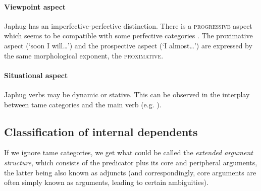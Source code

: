 \documentclass[a4paper, oneside, 12pt]{report}
\newcommand*{\citetable}[1]{Table~{#1}}
\newcommand*{\citepage}[1]{p.~{#1}}
\newcommand*{\term}[1]{\emph{#1}}
\newcommand{\category}[1]{\textsc{#1}}
\newcommand{\translate}[1]{`#1'}
\begin{document}
\paragraph*{Viewpoint aspect}
Japhug has an imperfective-perfective distinction.
There is a \category{progressive} aspect 
which seems to be compatible with some perfective categories
\citep[\citetable{21.8}]{jacques2021grammar}. 
The proximative aspect (\translate{soon I will\dots})
and the prospective aspect (\translate{I almost\dots})
are expressed by the same morphological exponent, the \category{proximative}.
    
\paragraph*{Situational aspect}
Japhug verbs may be dynamic or stative. 
This can be observed in the interplay between \ac{tame} categories
and the main verb (e.g. \citealt[\citepage{1102}]{jacques2021grammar}).

\subsection{Classification of internal dependents}\label{sec:grammatical.clause.internal}

If we ignore \ac{tame} categories,
we get what could be called the \term{extended argument structure},
which consists of the predicator plus its core and peripheral arguments,
the latter being also known as adjuncts
(and correspondingly, core arguments are often simply known as arguments,
leading to certain ambiguities). 
\end{document}
